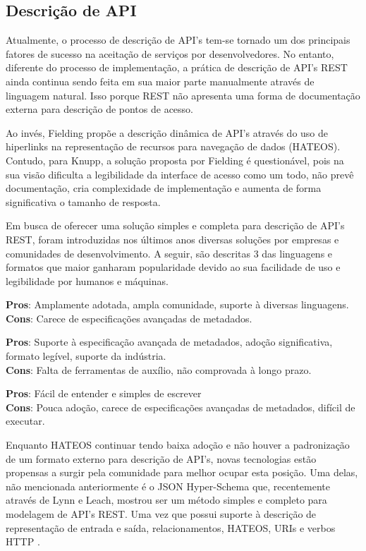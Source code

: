 \subsection[Descrição de API]{Descrição de API}

Atualmente, o processo de descrição de API's tem-se tornado um dos principais fatores de sucesso na aceitação de serviços por desenvolvedores. No entanto, diferente do processo de implementação, a prática de descrição de API's REST ainda continua sendo feita em sua maior parte manualmente através de linguagem natural. Isso porque REST não apresenta uma forma de documentação externa para descrição de pontos de acesso. \cite{LuckyEtAl2016}
 
Ao invés, Fielding propõe a descrição dinâmica de API's através do uso de hiperlinks na representação de recursos para navegação de dados (HATEOS). Contudo, para Knupp, a solução proposta por Fielding é questionável, pois na sua visão dificulta a legibilidade da interface de acesso como um todo, não prevê documentação, cria complexidade de implementação e aumenta de forma significativa o tamanho de resposta. \cite{Knupp2016}

Em busca de oferecer uma solução simples e completa para descrição de API's REST, foram introduzidas nos últimos anos diversas soluções por empresas e comunidades de desenvolvimento. A seguir, são descritas 3 das linguagens e formatos que maior ganharam popularidade devido ao sua facilidade de uso e legibilidade por humanos e máquinas. \cite{Sandoval2015}
 
\begin{description}[leftmargin=8em,style=nextline]
  \item[\textbf{OpenAPI}] \textbf{Pros}: Amplamente adotada, ampla comunidade, suporte à diversas linguagens. \\ \textbf{Cons}: Carece de especificações avançadas de metadados.
  \item[\textbf{RAML}] \textbf{Pros}: Suporte à especificação avançada de metadados, adoção significativa, formato legível, suporte da indústria. \\ \textbf{Cons}: Falta de ferramentas de auxílio, não comprovada à longo prazo.
  \item[\textbf{API Blueprint}] \textbf{Pros}: Fácil de entender e simples de escrever \\ \textbf{Cons}: Pouca adoção, carece de especificações avançadas de metadados, difícil de executar.
\end{description}

Enquanto HATEOS continuar tendo baixa adoção e não houver a padronização de um formato externo para descrição de API's, novas tecnologias estão propensas a surgir pela comunidade para melhor ocupar esta posição. Uma delas, não mencionada anteriormente é o JSON Hyper-Schema que, recentemente através de Lynn e Leach, mostrou ser um método simples e completo para modelagem de API's REST. Uma vez que possui suporte à descrição de representação de entrada e saída, relacionamentos, HATEOS, URIs e verbos HTTP  \cite{LynnEtAl2016} \cite{Leach2014}.
